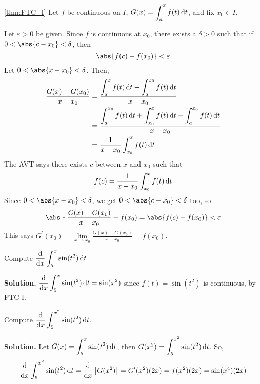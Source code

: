 \begin{Proof}{\ref{thm:FTC_I}}{}
    Let $ f $ be continuous on $ I $, $ \displaystyle G(x)=\int_{a}^{x} f(t)\odif{t} $,
    and fix $ x_0\in I $.

    Let $ \varepsilon>0 $ be given. Since $ f $ is continuous at $ x_0 $,
    there exists a $ \delta>0 $ such that if $ 0<\abs{c-x_0}<\delta $, then
    \[ \abs{f(c)-f(x_0)}<\varepsilon \]
    Let $ 0<\abs{x-x_0}<\delta $. Then,
    \begin{align*}
        \frac{G(x)-G(x_0)}{x-x_0}
         & =\frac{\displaystyle\int_{a}^{x} f(t)\odif{t} -\int_{a}^{x_0} f(t)\odif{t} }
        {x-x_0}                                                                          \\
         & =\frac{\displaystyle\int_{a}^{x_0} f(t)\odif{t} +\int_{x_0}^{x} f(t)\odif{t}-
        \int_{a}^{x_0} f(t)\odif{t} }{x-x_0}                                             \\
         & =\frac{1}{x-x_0} \int_{x_0}^{x} f(t)\odif{t}
    \end{align*}
    The AVT says there exists $ c $ between $ x $ and $ x_0 $ such that
    \[ f(c)=\frac{1}{x-x_0} \int_{x_0}^{x} f(t)\odif{t}  \]
    Since $ 0<\abs{x-x_0}<\delta $, we get $ 0<\abs{c-x_0}<\delta $ too,
    so
    \[
        \abs*{\frac{G(x)-G(x_0)}{x-x_0}-f(x_0)}=\abs{f(c)-f(x_0)}<\varepsilon
    \]
    This says
    $ \displaystyle G^\prime(x_0)=\lim\limits_{{x} \to {x_0}} \frac{G(x)-G(x_0)}{x-x_0}=f(x_0) $.
\end{Proof}

\begin{Example}{}{}
    Compute $ \displaystyle \odv{}{x}\int_{5}^{x} \sin(t^2)\odif{t} $

    \textbf{Solution.}
    $ \displaystyle \odv{}{x}\int_{5}^{x} \sin(t^2)\odif{t}=\sin(x^2) $
    since $ f(t)=\sin(t^2) $ is continuous, by FTC I.
\end{Example}

\begin{Example}{}{}
    Compute
    $ \displaystyle \odv{}{x}\int_{5}^{x^2} \sin(t^2)\odif{t} $.

    \textbf{Solution.} Let $ \displaystyle G(x)=\int_{5}^{x} \sin(t^2)\odif{t} $,
    then $ G(x^2)=\displaystyle \int_{5}^{x^2} \sin(t^2)\odif{t} $. So,
    \[
        \odv{}{x} \int_{5}^{x^2} \sin(t^2)\odif{t}
        =\odv{}{x} \left[ G(x^2) \right]
        =G^\prime(x^2) (2x)
        =f(x^2)(2x)
        =\sin(x^4) (2x)
    \]
\end{Example}

